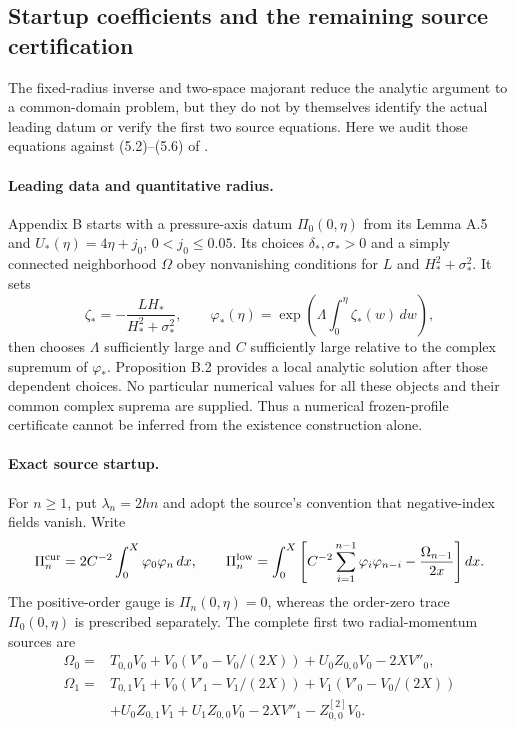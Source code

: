 \subsection*{Startup coefficients and the remaining source certification}
The fixed-radius inverse and two-space majorant reduce the analytic argument
to a common-domain problem, but they do not by themselves identify the actual
leading datum or verify the first two source equations. Here we audit those
equations against (5.2)--(5.6) of \cite{openai2026}.

\paragraph{Leading data and quantitative radius.}
Appendix B starts with a pressure-axis datum $\Pi_0(0,\eta)$ from its
Lemma A.5 and $U_*(\eta)=4\eta+j_0$, $0<j_0\le0.05$. Its choices
$\delta_*,\sigma_*>0$ and a simply connected neighborhood $\Omega$ obey
nonvanishing conditions for $L$ and $H_*^2+\sigma_*^2$. It sets
\[
\zeta_*=-\frac{LH_*}{H_*^2+\sigma_*^2},\qquad
\varphi_*(\eta)=\exp\left(\Lambda\int_0^\eta\zeta_*(w)\,dw\right),
\]
then chooses $\Lambda$ sufficiently large and $C$ sufficiently large
relative to the complex supremum of $\varphi_*$. Proposition B.2
provides a local analytic solution after those dependent choices.
No particular numerical values for all these objects and their
common complex suprema are supplied. Thus a numerical frozen-profile
certificate cannot be inferred from the existence construction alone.

\paragraph{Exact source startup.}
For $n\ge1$, put $\lambda_n=2hn$ and adopt the source's convention
that negative-index fields vanish. Write
\[
\Pi_n^{\rm cur}=2C^{-2}\int_0^X\varphi_0\varphi_n\,dx,\qquad
\Pi_n^{\rm low}=\int_0^X\left[
 C^{-2}\sum_{i=1}^{n-1}\varphi_i\varphi_{n-i}
 -\frac{\Omega_{n-1}}{2x}\right]dx.
\]
The positive-order gauge is $\Pi_n(0,\eta)=0$, whereas the
order-zero trace $\Pi_0(0,\eta)$ is prescribed separately. The
complete first two radial-momentum sources are
\[
\begin{aligned}
\Omega_0={}&T_{0,0}V_0+
 V_0(V'_0-V_0/(2X))+U_0Z_{0,0}V_0-2XV''_0,\\
\Omega_1={}&T_{0,1}V_1+
 V_0(V'_1-V_1/(2X))+V_1(V'_0-V_0/(2X))\\
 &+U_0Z_{0,1}V_1+U_1Z_{0,0}V_0
 -2XV''_1-Z^{[2]}_{0,0}V_0.
\end{aligned}
\]

